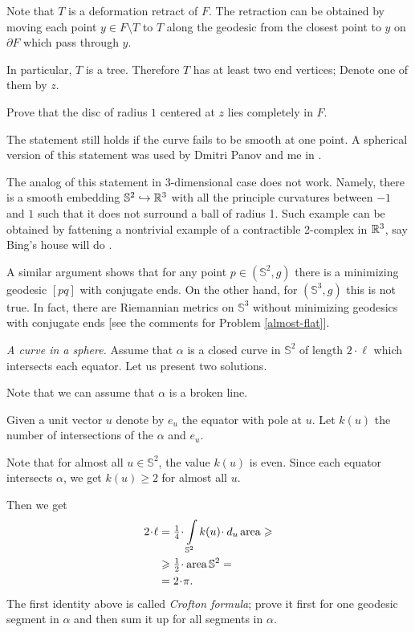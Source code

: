Note that $T$ is a
deformation retract of $F$.
The retraction can be obtained by moving each point $y\in F\setminus T$ to $T$
along the geodesic from the closest point to $y$ on $\partial F$ which pass through $y$.

In particular, $T$ is a tree.
Therefore $T$  has
at least two end vertices;
Denote one of them by $z$.

Prove that the disc of radius $1$ centered at $z$ lies completely in $F$.

The statement still holds if the curve fails to be smooth at one point.
A spherical version of this statement 
was used by Dmitri Panov and me 
in \cite{panov-petrunin-ramification}.

The analog of this statement in 3-dimensional case does not work.
Namely, there is a smooth embedding $\mathbb{S}^2\hookrightarrow \mathbb{R}^3$ 
with all the principle curvatures between $-1$ and $1$
such that it does not surround a ball of radius 1.
Such example can be obtained by fattening 
a nontrivial example of a contractible 2-complex in $\mathbb{R}^3$,
say Bing's house will do
\cite[see][]{bing}.

A similar argument shows that
for any point $p\in (\mathbb S^2,g)$ there is a minimizing geodesic $[pq]$ with conjugate ends.
On the other hand, 
for $(\mathbb S^3,g)$ this is not true.
In fact, 
there are Riemannian metrics on $\mathbb{S}^3$ 
without minimizing geodesics with conjugate ends
[see the comments for Problem \ref{almost-flat}].


\textit{A curve in a sphere.}
Assume that $\alpha$ is a closed curve in $\mathbb{S}^2$ of length $2\cdot\ell$ which intersects each equator.
Let us present two solutions.

Note that we can assume that $\alpha$ is a broken line.

Given a unit vector $u$ denote by $e_u$ the equator with pole at $u$.
Let $k(u)$ the number of intersections
of the $\alpha$ and $e_u$.

Note that for almost all $u\in \mathbb{S}^2$, the value $k(u)$ is even.
Since each equator intersects $\alpha$, we get $k(u)\ge 2$ for almost all $u$.

Then we get
\begin{align*}
2\cdot\ell&=\tfrac14\cdot\int\limits_{\mathbb{S}^2}k(u)\cdot\, d_u\area\ge 
\\
&\ge\tfrac12\cdot\area\mathbb{S}^2=
\\
&=2\cdot\pi.
\end{align*}
The first identity above is called \emph{Crofton formula};
prove it first for one geodesic segment in $\alpha$ and then sum it up for all segments in $\alpha$.

